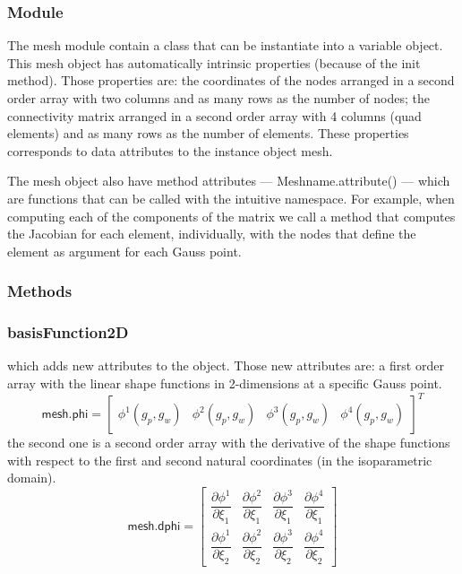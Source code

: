 \documentclass[11pt, a4paper]{article}
\numberwithin{equation}{section}
\begin{document}
\subsubsection{Module}

The mesh module contain a class that can be instantiate into a variable object. This mesh object has automatically intrinsic properties (because of the init method). Those properties are: the coordinates of the nodes arranged in a second order array with two columns and as many rows as the number of nodes; the connectivity matrix arranged in a second order array with 4 columns (quad elements) and as many rows as the number of elements. These properties corresponds to data attributes to the instance object mesh.

The mesh object also have method attributes ---\textsf{ Meshname.attribute() }--- which are functions that can be called with the intuitive namespace. For example, when computing each of the components of the matrix we call a method that computes the Jacobian for each element, individually, with the nodes that define the element as argument for each Gauss point.


\subsubsection{Methods}

\subsubsection*{basisFunction2D} which adds new attributes to the object. Those new attributes are: a first order array with the linear shape functions in 2-dimensions at a specific Gauss point.
\begin{equation*}
\textsf{mesh.phi} = \begin{bmatrix}
\phi^1(g_p, g_w) & \phi^2(g_p, g_w) & \phi^3(g_p, g_w) & \phi^4(g_p, g_w)
\end{bmatrix}^T
\end{equation*}
the second one is a second order array with the derivative of the shape functions with respect to the first and second natural coordinates (in the isoparametric domain).
\begin{equation*}
\textsf{mesh.dphi} = \begin{bmatrix}
\dfrac{\partial \phi^1}{\partial \xi_1} & \dfrac{\partial \phi^2}{\partial \xi_1} & \dfrac{\partial \phi^3}{\partial \xi_1} & \dfrac{\partial \phi^4}{\partial \xi_1}\\[.4cm]
\dfrac{\partial \phi^1}{\partial \xi_2} & \dfrac{\partial \phi^2}{\partial \xi_2} & \dfrac{\partial \phi^3}{\partial \xi_2} & \dfrac{\partial \phi^4}{\partial \xi_2}
\end{bmatrix}
\end{equation*}
\end{document}
